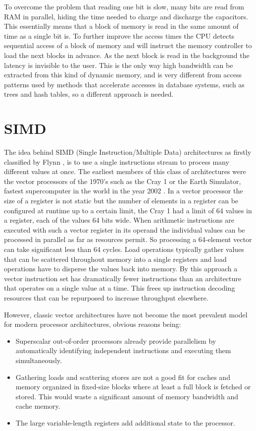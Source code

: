 To overcome the problem that reading one bit is slow, many bits are read from
RAM in parallel, hiding the time needed to charge and discharge the capacitors.
This essentially means that a block of memory is read in the same amount of time
as a single bit is. To further improve the access times the CPU detects sequential
access of a block of memory and will instruct the memory controller to load
the next blocks in advance. As the next block is read in the background the
latency is invisible to the user. This is the only way high bandwidth can be
extracted from this kind of dynamic memory, and is very different from access
patterns used by methods that accelerate accesses in database systems, such as
trees and hash tables, so a different approach is needed.

\section{SIMD}

The idea behind SIMD (Single Instruction/Multiple Data) architectures as
firstly classified by Flynn \cite{flynnsimd}, is to use a single instructions
stream to process many different values at once. The earliest members of this
class of architectures were the vector processors of the 1970's such as the
Cray 1 or the Earth Simulator, fastest supercomputer in the world in the year
2002 \cite{hennessyarch}. In a vector processor the size of a register is not
static but the number of elements in a register can be configured at runtime up
to a certain limit, the Cray 1 had a limit of 64 values in a register, each of
the values 64 bits wide. When arithmetic instructions are executed with such a
vector register in its operand the individual values can be processed in parallel
as far as resources permit. So processing a 64-element vector can take
significant less than 64 cycles. Load operations typically gather values that
can be scattered throughout memory into a single registers and load operations
have to disperse the values back into memory. By this approach a vector
instruction set has dramatically fewer instructions than an architecture that
operates on a single value at a time. This frees up instruction decoding
resources that can be repurposed to increase throughput elsewhere.

However, classic vector architectures have not become the most prevalent model
for modern processor architectures, obvious reasons being:
\begin{itemize}
\item Superscalar out-of-order processors already provide parallelism by
automatically identifying independent instructions and executing them
simultaneously.
\item Gathering loads and scattering stores are not a good fit for caches and
memory organized in fixed-size blocks where at least a full block is fetched or
stored. This would waste a significant amount of memory bandwidth and cache
memory.
\item The large variable-length registers add additional state to the processor.
\end{itemize}

